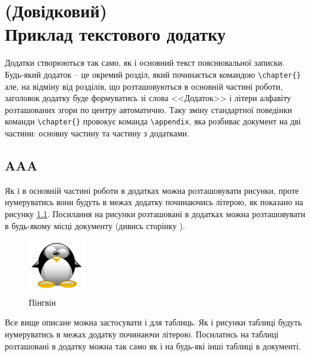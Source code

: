 \chapter[(Довідковий) Приклад текстового додатку]{(Довідковий)\\ Приклад текстового додатку}
\label{apdx:text}

Додатки створюються так само, як і основний текст пояснювальної записки. Будь-який додаток -- це окремий розділ, який
починається командою \verb|\chapter{}| але, на відміну від розділів, що розташовуються в основній частині роботи, заголовок
додатку буде формуватись зі слова <<Додаток>>  і літери алфавіту розташованих згори по центру автоматично. Таку зміну
стандартної поведінки команди \verb|\chapter{}| провокує команда \verb|\appendix|, яка розбиває документ на дві частини: 
основну частину та частину з додатками.

\section*{AAA}

Як і в основній частині роботи в додатках можна розташовувати рисунки, проте нумеруватись вони будуть в межах додатку
починаючись літерою, як показано на рисунку \ref{apdxfig:tux}. Посилання на рисунки розташовані в додатках можна розташовувати 
в будь-якому місці документу (дивись сторінку \pageref{linkpage}).


\begin{figure}[h]
 \centering\includegraphics{img/Tux.png}
 \caption{Пінгвін}
 \label{apdxfig:tux}
\end{figure}

Все вище описане можна застосувати і для таблиць. Як і рисунки таблиці будуть нумеруватись в межах додатку починаючи літерою.
Посилатись на таблиці розташовані в додатку можна так само як і на будь-які інші таблиці в документі. 

